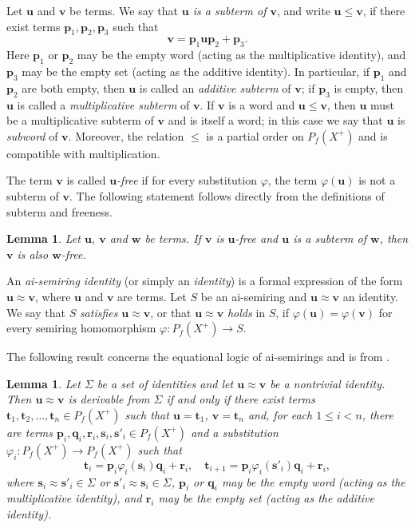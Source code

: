 \documentclass[reqno]{amsart}
\theoremstyle{plain}
\newtheorem{lem}[thm]{Lemma}
\theoremstyle{definition}
\newcommand{\up}[1]{\textup{#1}}
\newcommand{\bp}{\mathbf{p}}
\newcommand{\bq}{\mathbf{q}}
\newcommand{\br}{\mathbf{r}}
\newcommand{\bs}{\mathbf{s}}
\newcommand{\bt}{\mathbf{t}}
\newcommand{\bu}{\mathbf{u}}
\newcommand{\bv}{\mathbf{v}}
\newcommand{\bw}{\mathbf{w}}
\begin{document}
Let $\bu$ and $\bv$ be terms.
We say that \emph{$\bu$ is a subterm of $\bv$}, and write $\bu\leq \bv$,
if there exist terms $\bp_1, \bp_2, \bp_3$ such that
\[
\bv=\bp_1\bu\bp_2+\bp_3.
\]
Here $\bp_1$ or $\bp_2$ may be the empty word (acting as the multiplicative identity),
and $\bp_3$ may be the empty set (acting as the additive identity).
In particular, if $\bp_1$ and $\bp_2$ are both empty, then $\bu$ is called an \emph{additive subterm} of $\bv$;
if $\bp_3$ is empty, then $\bu$ is called a \emph{multiplicative subterm} of $\bv$.
If $\bv$ is a word and $\bu\leq \bv$,
then $\bu$ must be a multiplicative subterm of $\bv$ and is itself a word;
in this case we say that $\bu$ is \emph{subword} of $\bv$.
Moreover, the relation $\leq$ is a partial order on $P_f(X^+)$
and is compatible with multiplication.

The term $\bv$ is called \emph{$\bu$-free} if for every substitution $\varphi$,
the term $\varphi(\bu)$ is not a subterm of $\bv$.
The following statement follows directly from the definitions of subterm and freeness.

\begin{lem}\label{lem26012701}
Let $\bu$, $\bv$ and $\bw$ be terms.
If $\bv$ is $\bu$-free and $\bu$ is a subterm of $\bw$, then $\bv$ is also $\bw$-free.
\end{lem}

An \emph{ai-semiring identity} (or simply an \emph{identity}) is a formal expression of the form
$\bu\approx \bv$, where $\bu$ and $\bv$ are terms.
Let $S$ be an ai-semiring and $\bu\approx \bv$ an identity.
We say that $S$ \emph{satisfies} $\bu\approx \bv$, or that $\bu\approx \bv$ \emph{holds} in $S$,
if $\varphi(\bu)=\varphi(\bv)$ for every semiring homomorphism $\varphi\colon P_f(X^+) \rightarrow S$.

The following result concerns the equational logic of ai-semirings and is from \cite[Lemma 3.1]{dolinka}.
\begin{lem}\label{lem02}
Let $\Sigma$ be a set of identities and let $\bu\approx \bv$ be a nontrivial identity.
Then $\bu\approx \bv$ is derivable from $\Sigma$ if and only if there
exist terms $\bt_1, \bt_2, \dots, \bt_n\in P_f(X^+)$ such that $\bu=\bt_1$, $\bv=\bt_n$ and,
for each $1\leq i<n$, there are terms $\bp_i, \bq_i, \br_i, \bs_i, \bs'_{i} \in P_f(X^+)$ and a substitution
$\varphi_i\colon P_f(X^+) \to P_f(X^+)$ such that
\[
\bt_i = \bp_i\varphi_i(\bs_i)\bq_i+\br_i, \quad \bt_{i+1}=\bp_i\varphi_i(\bs'_{i})\bq_i+\br_i,
\]
where $\bs_{i} \approx \bs'_{i}\in\Sigma$ or $\bs'_{i} \approx \bs_{i} \in \Sigma$,
$\bp_i$ or $\bq_i$ may be the empty word \up(acting as the multiplicative identity\up),
and $\br_i$ may  be the empty set \up(acting as the additive identity\up).
\end{lem}
\end{document}
